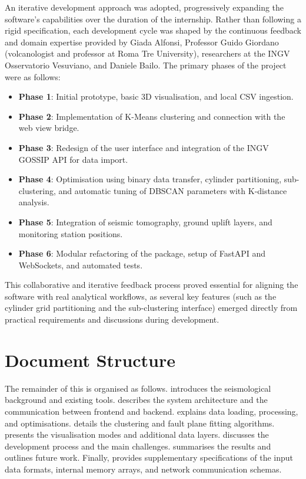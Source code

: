 An iterative development approach was adopted, progressively expanding the software's capabilities over the duration of the internship. Rather than following a rigid specification, each development cycle was shaped by the continuous feedback and domain expertise provided by Giada Alfonsi, Professor Guido Giordano (volcanologist and professor at Roma Tre University), researchers at the INGV Osservatorio Vesuviano, and Daniele Bailo. The primary phases of the project were as follows:

\begin{itemize}
    \item \textbf{Phase 1}: Initial prototype, basic 3D visualisation, and local CSV ingestion.
    \item \textbf{Phase 2}: Implementation of K-Means clustering and connection with the web view bridge.
    \item \textbf{Phase 3}: Redesign of the user interface and integration of the INGV GOSSIP API for data import.
    \item \textbf{Phase 4}: Optimisation using binary data transfer, cylinder partitioning, sub-clustering, and automatic tuning of DBSCAN parameters with K-distance analysis.
    \item \textbf{Phase 5}: Integration of seismic tomography, ground uplift layers, and monitoring station positions.
    \item \textbf{Phase 6}: Modular refactoring of the package, setup of FastAPI and WebSockets, and automated tests.
\end{itemize}

This collaborative and iterative feedback process proved essential for aligning the software with real analytical workflows, as several key features (such as the cylinder grid partitioning and the sub-clustering interface) emerged directly from practical requirements and discussions during development.

\section{Document Structure}
\label{sec:structure}

The remainder of this  is organised as follows.  introduces the seismological background and existing tools.  describes the system architecture and the communication between frontend and backend.  explains data loading, processing, and optimisations.  details the clustering and fault plane fitting algorithms.  presents the visualisation modes and additional data layers.  discusses the development process and the main challenges.  summarises the results and outlines future work. Finally,  provides supplementary specifications of the input data formats, internal memory arrays, and network communication schemas.


